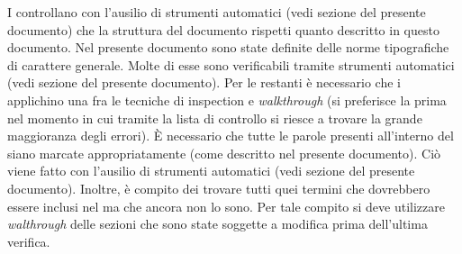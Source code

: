 						I  controllano con l'ausilio di strumenti automatici (vedi sezione  del presente documento) che la struttura del documento rispetti quanto descritto in questo documento.
						Nel presente documento sono state definite delle norme tipografiche di carattere generale. Molte di esse sono verificabili tramite strumenti automatici (vedi sezione  del presente documento). Per le restanti è necessario che i  applichino una fra le tecniche di inspection e \textit{walkthrough}	(si preferisce la prima nel momento in cui tramite la lista di controllo si riesce a trovare la grande maggioranza degli errori).
						È necessario che tutte le parole presenti all'interno del  siano marcate appropriatamente (come descritto nel presente documento). Ciò viene fatto con l'ausilio di strumenti automatici (vedi sezione  del presente documento). Inoltre, è compito dei  trovare tutti quei termini che dovrebbero essere inclusi nel  ma che ancora non lo sono. Per tale compito si deve utilizzare \textit{walthrough} delle sezioni che sono state soggette a modifica prima dell'ultima verifica.

